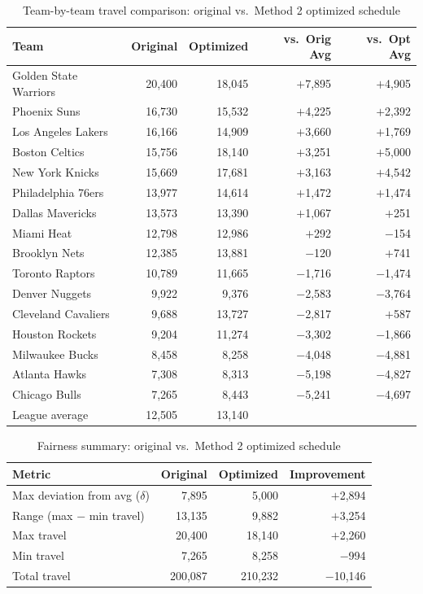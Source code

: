 \documentclass[11pt, letterpaper]{article}
\begin{document}
\begin{table}[h]
\centering
\small
\caption{Team-by-team travel comparison: original vs.\ Method 2 optimized schedule}
\begin{tabular}{lrrrr}
\toprule
\textbf{Team} & \textbf{Original} & \textbf{Optimized} & \textbf{vs.\ Orig Avg} & \textbf{vs.\ Opt Avg} \\
\midrule
Golden State Warriors & 20,400 & 18,045 & $+$7,895 & $+$4,905 \\
Phoenix Suns          & 16,730 & 15,532 & $+$4,225 & $+$2,392 \\
Los Angeles Lakers    & 16,166 & 14,909 & $+$3,660 & $+$1,769 \\
Boston Celtics        & 15,756 & 18,140 & $+$3,251 & $+$5,000 \\
New York Knicks       & 15,669 & 17,681 & $+$3,163 & $+$4,542 \\
Philadelphia 76ers    & 13,977 & 14,614 & $+$1,472 & $+$1,474 \\
Dallas Mavericks      & 13,573 & 13,390 & $+$1,067 & $+$251   \\
Miami Heat            & 12,798 & 12,986 & $+$292   & $-$154   \\
Brooklyn Nets         & 12,385 & 13,881 & $-$120   & $+$741   \\
Toronto Raptors       & 10,789 & 11,665 & $-$1,716 & $-$1,474 \\
Denver Nuggets        & 9,922  & 9,376  & $-$2,583 & $-$3,764 \\
Cleveland Cavaliers   & 9,688  & 13,727 & $-$2,817 & $+$587   \\
Houston Rockets       & 9,204  & 11,274 & $-$3,302 & $-$1,866 \\
Milwaukee Bucks       & 8,458  & 8,258  & $-$4,048 & $-$4,881 \\
Atlanta Hawks         & 7,308  & 8,313  & $-$5,198 & $-$4,827 \\
Chicago Bulls         & 7,265  & 8,443  & $-$5,241 & $-$4,697 \\
\midrule
League average        & 12,505 & 13,140 & & \\
\bottomrule
\end{tabular}
\end{table}

\begin{table}[h]
\centering
\small
\caption{Fairness summary: original vs.\ Method 2 optimized schedule}
\begin{tabular}{lrrr}
\toprule
\textbf{Metric} & \textbf{Original} & \textbf{Optimized} & \textbf{Improvement} \\
\midrule
Max deviation from avg ($\delta$) & 7,895  & 5,000  & $+$2,894  \\
Range (max $-$ min travel)        & 13,135 & 9,882  & $+$3,254  \\
Max travel                        & 20,400 & 18,140 & $+$2,260  \\
Min travel                        & 7,265  & 8,258  & $-$994    \\
Total travel                      & 200,087 & 210,232 & $-$10,146 \\
\bottomrule
\end{tabular}
\end{table}
\end{document}
